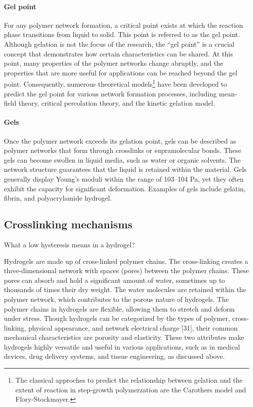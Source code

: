 \paragraph{Gel point} For any polymer network formation, a critical point exists at which the reaction phase transitions from liquid to solid. 
This point is referred to as the gel point.
Although gelation is not the focus of the research, the ``gel point'' is a crucial concept that demonstrates how certain characteristics can be shared.
At this point, many properties of the polymer networks change abruptly, and the properties that are more useful for applications can be reached beyond the gel point.
Consequently, numerous theoretical models\footnote{The classical approches to predict the relationship between gelation and the extent of reaction in step-growth polymerzation are the Carothers model and Flory-Stockmayer\citep{guPolymerNetworksPlastics2020}.} have been developed to predict the gel point for various network formation processes, including mean-field theory, critical percolation theory, and the kinetic gelation model\citep{guPolymerNetworksPlastics2020}.


\paragraph{Gels} Once the polymer network exceeds its gelation point, gels can be described as polymer networks that form through crosslinks or supramolecular bonds. 
These gels can become swollen in liquid media, such as water or organic solvents.
The network structure guarantees that the liquid is retained within the material.
Gels generally display Young's moduli within the range of 103–104 Pa, yet they often exhibit the capacity for significant deformation.
Examples of gels include gelatin, fibrin, and polyacrylamide hydrogel\citep{guPolymerNetworksPlastics2020}.

\subsection{Crosslinking mechanisms}\label{ch1:Cross-linking}

What a low hysteresis means in a hydrogel?

Hydrogels are made up of cross-linked polymer chains. 
The cross-linking creates a three-dimensional network with spaces (pores) between the polymer chains.  
These pores can absorb and hold a significant amount of water, sometimes up to  thousands of times their dry weight. 
The water molecules are retained within the  polymer network, which contributes to the porous nature of hydrogels. 
The polymer chains in hydrogels are flexible, allowing them to stretch and deform under  stress. 
Though hydrogels can be categorized by the types of polymer, cross-linking,  physical appearance, and network electrical charge [31], their common mechanical characteristics are porosity and elasticity. 
These two attributes make hydrogels  highly versatile and useful in various applications, such as in medical devices, drug  delivery systems, and tissue engineering, as discussed above.


